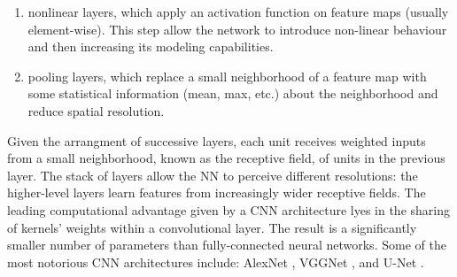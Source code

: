 \begin{description}
\begin{enumerate}[i]
            \item nonlinear layers, which apply an activation function on feature maps (usually element-wise). This step allow the network to introduce non-linear behaviour and then increasing its modeling capabilities.

            \item pooling layers, which replace a small neighborhood of a feature map with some statistical information (mean, max, etc.) about the neighborhood and reduce spatial resolution.
        \end{enumerate}

        Given the arrangment of successive layers, each unit receives weighted inputs from a small neighborhood, known as the receptive field, of units in the previous layer. The stack of layers allow the NN to perceive different resolutions: the higher-level layers learn features from increasingly wider receptive fields. The leading computational advantage given by a CNN architecture lyes in the sharing of kernels' weights within a convolutional layer. The result is a significantly smaller number of parameters than fully-connected neural networks. Some of the most notorious CNN architectures include: AlexNet \cite{AlexNet}, VGGNet \cite{1409.1556}, and U-Net \cite{U-net}.
\end{description}

